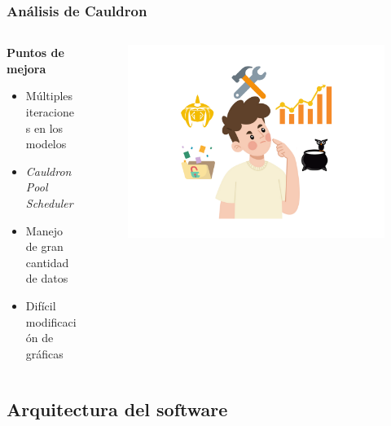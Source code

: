 \documentclass[
	11pt, %
	aspectratio=169, %
]{beamer}
\begin{document}
\begin{frame}
	\frametitle{Análisis de Cauldron}

	\begin{columns}[c] %
		\begin{column}{0.45\textwidth} %
			\textbf{Puntos de mejora}
			\begin{itemize}
				\item Múltiples iteraciones en los modelos
				\item \emph{Cauldron Pool Scheduler}
				\item Manejo de gran cantidad de datos
				\item Difícil modificación de gráficas
			\end{itemize}
		\end{column}
		\begin{column}{0.55\textwidth} %
			\begin{figure}
				\includegraphics[width=\linewidth]{cauldron_improvements.pdf}
			\end{figure}
		\end{column}
	\end{columns}
\end{frame}


\subsection[Arquitectura del software]{Arquitectura del software}
\end{document}
